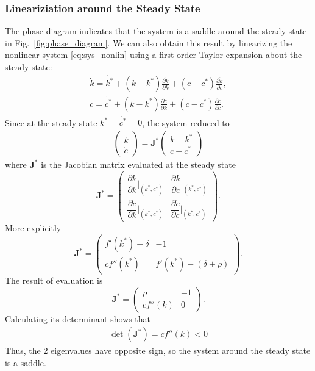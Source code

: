 \documentclass[11pt,a4paper]{book}
\theoremstyle{definition}\newtheorem{definition}{Definition}
\theoremstyle{definition}\newtheorem{fact}{Fact}
\theoremstyle{definition}\newtheorem{remark}{Remark}
\theoremstyle{definition}\newtheorem{ex}{Ex.}
\theoremstyle{definition}\newtheorem{project}{Project}
\theoremstyle{definition}\newtheorem{problem}{Problem}
\theoremstyle{definition}\newtheorem{example}{Example}
\numberwithin{theorem}{section}
\numberwithin{corollary}{chapter}
\numberwithin{assumption}{chapter}
\numberwithin{definition}{chapter}
\numberwithin{prop}{chapter}
\numberwithin{notation}{chapter}
\numberwithin{problem}{chapter}
\numberwithin{example}{chapter}
\numberwithin{fact}{chapter}
\numberwithin{ex}{chapter}
\def\J{\mathbf J}
\begin{document}
	\subsubsection{Lineariziation around the Steady State}
	The phase diagram indicates that the system is a saddle around the steady state in Fig.~\ref{fig:phase_diagram}. We can also obtain this result by linearizing the nonlinear system \eqref{eq:sys_nonlin} using a first-order Taylor expansion about the steady state:
	\begin{align*}
		\dot{k} = \dot{k^*} + (k-k^*) \frac{\partial \dot{k}}{\partial k} + (c-c^*) \frac{\partial \dot{k}}{\partial c}, \\
		\dot{c} = \dot{c^*} + (k-k^*)\frac{\partial \dot{c}}{\partial k} + (c - c^*)\frac{\partial \dot{c}}{\partial c}.
	\end{align*}
	Since at the steady state $\dot{k^*} = \dot{c^*} = 0$, the system reduced to
	\begin{align*}
		\begin{pmatrix}
			\dot{k} \\ \dot{c}
		\end{pmatrix}
		=
		\J^*
		\begin{pmatrix}
			k - k^* \\ c - c^*
		\end{pmatrix}
	\end{align*}
	where $\J^*$ is the Jacobian matrix evaluated at the steady state
	\begin{equation*}
		{\J}^{*}= 
			\begin{pmatrix}
				\dfrac{\partial \dot{k}}{\partial k}\vert_{(k^{*},c^{*})}  & \dfrac{\partial \dot{k}}{\partial c}\vert_{(k^{*},c^{*})} \\ 
				\dfrac{\partial\dot{c}}{\partial k}\vert_{(k^{*},c^{*})} & \dfrac{\partial \dot{c}}{\partial c}\vert_{(k^{*},c^{*})}
		\end{pmatrix}.
	\end{equation*}
	More explicitly
	\begin{equation*}
		{\J}^{*}= 
		\begin{pmatrix}
			f'(k^*) - \delta & -1 \\
			c f''(k^*) & f'(k^*) - (\delta + \rho)
		\end{pmatrix}.
	\end{equation*}
	The result of evaluation is
	\begin{equation*}
		{\J}^{*}= 
		\begin{pmatrix}
			\rho & - 1 \\
			c f''(k) & 0
		\end{pmatrix}.
	\end{equation*}
	Calculating its determinant shows that
	\begin{align*}
		\det(\J^*) = c f''(k) < 0
	\end{align*}
	Thus, the 2 eigenvalues have opposite sign, so the system around the steady state is a saddle.
	
\end{document}
